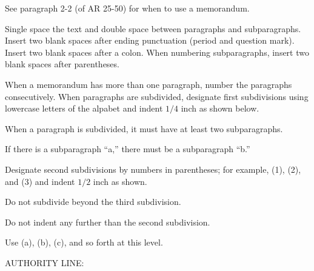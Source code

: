 \documentclass{armymemo}
\begin{document}
\AMsethead

\Ni See paragraph 2-2 (of AR 25-50) for when to use a memorandum.

\Ni Single space the text and double space between paragraphs and
subparagraphs. Insert two blank spaces after ending punctuation (period and
question mark). %
Insert two blank spaces after a colon. When numbering subparagraphs, insert two
blank spaces after parentheses.

\Ni When a memorandum has more than one paragraph, number the paragraphs
consecutively. When paragraphs are subdivided, designate first subdivisions
using lowercase letters of the alpabet and indent $1/4$ inch as shown below.

\Nii When a paragraph is subdivided, it must have at least two subparagraphs.

\Nii If there is a subparagraph ``a,'' there must be a subparagraph ``b.''

\Niii Designate second subdivisions by numbers in parentheses; for example, (1),
(2), and (3) and indent $1/2$ inch as shown.

\Niii Do not subdivide beyond the third subdivision.

\Niiii Do not indent any further than the second subdivision.

\Niiii Use (a), (b), (c), and so forth at this level.

 AUTHORITY LINE:

\end{document}
